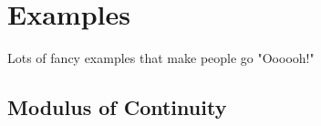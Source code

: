 \section{Examples}
\label{sec:examples}

Lots of fancy examples that make people go "Oooooh!"
\subsection{Modulus of Continuity}
\label{sec:we-show-modulus-of-continuity-example}

